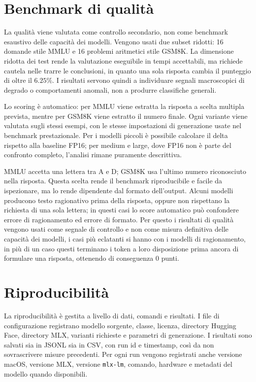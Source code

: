\section{Benchmark di qualità}
\label{sec:experimental_quality_benchmark}

La qualità viene valutata come controllo secondario, non come benchmark
esaustivo delle capacità dei modelli. Vengono usati due subset ridotti: 16
domande stile MMLU e 16 problemi aritmetici stile GSM8K. La dimensione ridotta
dei test rende la valutazione eseguibile in tempi accettabili, 
ma richiede cautela nelle trarre le conclusioni, in quanto una sola risposta cambia 
il punteggio di oltre il $6.25\%$. I risultati servono quindi a individuare segnali macroscopici 
di degrado o comportamenti anomali, non a produrre classifiche generali.

Lo scoring è automatico: per MMLU viene estratta la risposta a scelta multipla
prevista, mentre per GSM8K viene estratto il numero finale. Ogni variante viene
valutata sugli stessi esempi, con le stesse impostazioni di generazione usate
nel benchmark prestazionale. Per i modelli piccoli è possibile calcolare il delta
rispetto alla baseline FP16; per medium e large, dove FP16 non è parte del
confronto completo, l'analisi rimane puramente descrittiva.

MMLU accetta una lettera tra A e D; GSM8K usa l'ultimo numero riconosciuto nella risposta. 
Questa scelta rende il benchmark riproducibile e facile da ispezionare, ma lo rende dipendente dal
formato dell'output. Alcuni modelli producono testo ragionativo prima della
risposta, oppure non rispettano la richiesta di una sola lettera; in questi casi
lo score automatico può confondere errore di ragionamento ed errore di
formato. Per questo i risultati di qualità vengono usati come segnale di
controllo e non come misura definitiva delle capacità dei modelli, i casi più eclatanti si hanno con i modelli di ragionamento,
in più di un caso questi terminano i token a loro disposizione prima ancora di formulare una risposta, ottenendo di conseguenza 0 punti.

\section{Riproducibilità}
\label{sec:experimental_reproducibility}

La riproducibilità è gestita a livello di dati, comandi e risultati. I file
di configurazione registrano modello sorgente, classe, licenza, directory
Hugging Face, directory MLX, varianti richieste e parametri di generazione. I
risultati sono salvati sia in JSONL sia in CSV, con run id e timestamp, così
da non sovrascrivere misure precedenti. Per ogni run vengono registrati anche
versione macOS, versione MLX, versione \texttt{mlx-lm}, comando, hardware e
metadati del modello quando disponibili.

